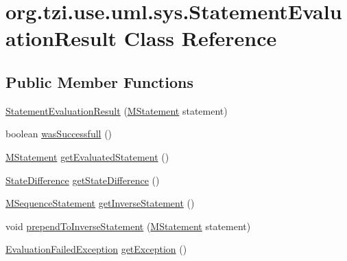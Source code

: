 \hypertarget{classorg_1_1tzi_1_1use_1_1uml_1_1sys_1_1_statement_evaluation_result}{\section{org.\-tzi.\-use.\-uml.\-sys.\-Statement\-Evaluation\-Result Class Reference}
\label{classorg_1_1tzi_1_1use_1_1uml_1_1sys_1_1_statement_evaluation_result}
}
\subsection*{Public Member Functions}
\begin{DoxyCompactItemize}
\item 
\hyperlink{classorg_1_1tzi_1_1use_1_1uml_1_1sys_1_1_statement_evaluation_result_a3e9bab8316307781eb92210cbe792799}{Statement\-Evaluation\-Result} (\hyperlink{classorg_1_1tzi_1_1use_1_1uml_1_1sys_1_1soil_1_1_m_statement}{M\-Statement} statement)
\item 
boolean \hyperlink{classorg_1_1tzi_1_1use_1_1uml_1_1sys_1_1_statement_evaluation_result_af8cb0a836622fd9470018fd340e154b1}{was\-Successfull} ()
\item 
\hyperlink{classorg_1_1tzi_1_1use_1_1uml_1_1sys_1_1soil_1_1_m_statement}{M\-Statement} \hyperlink{classorg_1_1tzi_1_1use_1_1uml_1_1sys_1_1_statement_evaluation_result_aacc135c021fcb1304aef75089420ce9f}{get\-Evaluated\-Statement} ()
\item 
\hyperlink{classorg_1_1tzi_1_1use_1_1util_1_1soil_1_1_state_difference}{State\-Difference} \hyperlink{classorg_1_1tzi_1_1use_1_1uml_1_1sys_1_1_statement_evaluation_result_a9adf7fb5185207c5cb6f03a3408589c8}{get\-State\-Difference} ()
\item 
\hyperlink{classorg_1_1tzi_1_1use_1_1uml_1_1sys_1_1soil_1_1_m_sequence_statement}{M\-Sequence\-Statement} \hyperlink{classorg_1_1tzi_1_1use_1_1uml_1_1sys_1_1_statement_evaluation_result_a9db3597765dd8b2fb1bfe225c074859a}{get\-Inverse\-Statement} ()
\item 
void \hyperlink{classorg_1_1tzi_1_1use_1_1uml_1_1sys_1_1_statement_evaluation_result_ae339b6d48366134bdb92cf6bfc5199d5}{prepend\-To\-Inverse\-Statement} (\hyperlink{classorg_1_1tzi_1_1use_1_1uml_1_1sys_1_1soil_1_1_m_statement}{M\-Statement} statement)
\item 
\hyperlink{classorg_1_1tzi_1_1use_1_1util_1_1soil_1_1exceptions_1_1_evaluation_failed_exception}{Evaluation\-Failed\-Exception} \hyperlink{classorg_1_1tzi_1_1use_1_1uml_1_1sys_1_1_statement_evaluation_result_ab5860bcfa12bb9b291154535a7b5ad87}{get\-Exception} ()

\end{DoxyCompactItemize}
